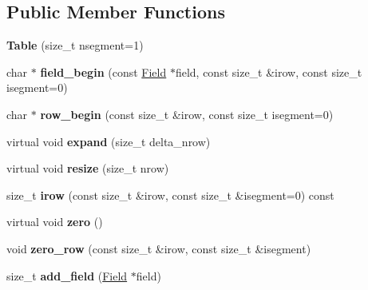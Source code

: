 \subsection*{Public Member Functions}
\begin{DoxyCompactItemize}
\item 
{\bfseries Table} (size\+\_\+t nsegment=1)\hypertarget{classTable_ae1dbb32b5ecc4a00bdad1cb374abf8c7}{}\label{classTable_ae1dbb32b5ecc4a00bdad1cb374abf8c7}

\item 
char $\ast$ {\bfseries field\+\_\+begin} (const \hyperlink{classField}{Field} $\ast$field, const size\+\_\+t \&irow, const size\+\_\+t isegment=0)\hypertarget{classTable_a73fd205958befbe99b7bad0a8fcd5dcf}{}\label{classTable_a73fd205958befbe99b7bad0a8fcd5dcf}

\item 
char $\ast$ {\bfseries row\+\_\+begin} (const size\+\_\+t \&irow, const size\+\_\+t isegment=0)\hypertarget{classTable_a4d9e8c3c175e18396cc36794a724a332}{}\label{classTable_a4d9e8c3c175e18396cc36794a724a332}

\item 
virtual void {\bfseries expand} (size\+\_\+t delta\+\_\+nrow)\hypertarget{classTable_a8377eb2e687a2e59c00ce2a5ac57a019}{}\label{classTable_a8377eb2e687a2e59c00ce2a5ac57a019}

\item 
virtual void {\bfseries resize} (size\+\_\+t nrow)\hypertarget{classTable_a1b74b77f28744aa15c9a704a9577e80d}{}\label{classTable_a1b74b77f28744aa15c9a704a9577e80d}

\item 
size\+\_\+t {\bfseries irow} (const size\+\_\+t \&irow, const size\+\_\+t \&isegment=0) const \hypertarget{classTable_a4be760d5b55da5346bc596fc20665470}{}\label{classTable_a4be760d5b55da5346bc596fc20665470}

\item 
virtual void {\bfseries zero} ()\hypertarget{classTable_aa68576cdd35bf3994d2fbb4c21d30a49}{}\label{classTable_aa68576cdd35bf3994d2fbb4c21d30a49}

\item 
void {\bfseries zero\+\_\+row} (const size\+\_\+t \&irow, const size\+\_\+t \&isegment)\hypertarget{classTable_a5e76e637cd8ed9d8bcc1797ef416f2e6}{}\label{classTable_a5e76e637cd8ed9d8bcc1797ef416f2e6}

\item 
size\+\_\+t {\bfseries add\+\_\+field} (\hyperlink{classField}{Field} $\ast$field)\hypertarget{classTable_a61b74bcfa1a1f6c4e79b3c2579854961}{}\label{classTable_a61b74bcfa1a1f6c4e79b3c2579854961}


\end{DoxyCompactItemize}
